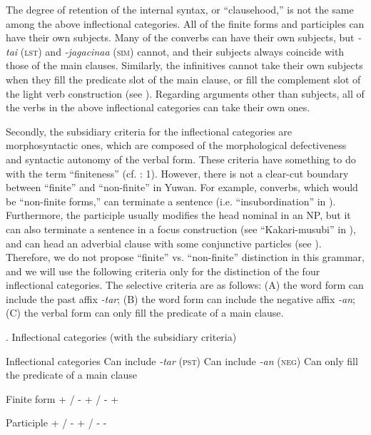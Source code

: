 The degree of retention of the internal syntax, or “clausehood,” is not the same among the above inflectional categories. All of the finite forms and participles can have their own subjects. Many of the converbs can have their own subjects, but \textit{{}-tai} (\textsc{lst}) and \textit{{}-jagacinaa} (\textsc{sim}) cannot, and their subjects always coincide with those of the main clauses. Similarly, the infinitives cannot take their own subjects when they fill the predicate slot of the main clause, or fill the complement slot of the light verb construction (see ). Regarding arguments other than subjects, all of the verbs in the above inflectional categories can take their own ones.

  Secondly, the subsidiary criteria for the inflectional categories are morphosyntactic ones, which are composed of the morphological defectiveness and syntactic autonomy of the verbal form. These criteria have something to do with the term “finiteness” (cf. \citealt{Nikolaeva2007}: 1). However, there is not a clear-cut boundary between “finite” and “non-finite” in Yuwan. For example, converbs, which would be “non-finite forms,” can terminate a sentence (i.e. “insubordination” in ). Furthermore, the participle usually modifies the head nominal in an NP, but it can also terminate a sentence in a focus construction (see “Kakari-musubi” in ), and can head an adverbial clause with some conjunctive particles (see ). Therefore, we do not propose “finite” vs. “non-finite” distinction in this grammar, and we will use the following criteria only for the distinction of the four inflectional categories. The selective criteria are as follows: (A) the word form can include the past affix \textit{{}-tar}; (B) the word form can include the negative affix \textit{{}-an}; (C) the verbal form can only fill the predicate of a main clause.

\begin{styleBeschriftung}
\textmd{}\textmd{. Inflectional categories (with the subsidiary criteria)}
\end{styleBeschriftung}

Inflectional categories  Can include \textit{{}-tar} (\textsc{pst})  Can include \textit{{}-an} (\textsc{neg})  Can only fill the predicate of a main clause

Finite form  + / -  + / -  +

Participle  + / -  + / -  {}-

